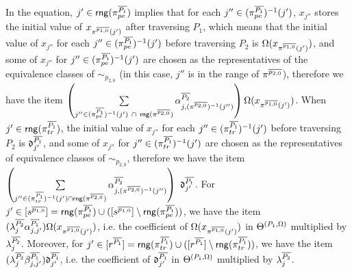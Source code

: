 In the equation, $j' \in  \mathsf{rng}(\pi^{\overline{P_1}}_{pe})$ implies that for each $j'' \in  (\pi^{\overline{P_1}}_{pe})^{-1}(j')$,  $x_{j''}$ stores the initial value of $x_{\pi^{\overline{p_{1,0}}}(j')}$ after traversing $P_1$, which means that the initial value of $x_{j''}$ for each $j'' \in  (\pi^{\overline{P_1}}_{pe})^{-1}(j')$ before traversing $P_2$ is $\Omega(x_{\pi^{\overline{p_{1,0}}}(j')})$, and some of $x_{j''}$ for $j'' \in  (\pi^{\overline{P_1}}_{pe})^{-1}(j')$ are chosen as the representatives of the equivalence classes of $\sim_{p_{2,0}}$ (in this case, $j''$ is in the range of $\pi^{\overline{p_{2,0}}}$), therefore we have the item $\left( \sum \limits_{j'' \in (\pi^{\circled{P_1}}_{pe})^{-1}(j')\ \cap\ \rng(\pi^{\circled{p_{2,0}}})}  \csta^{\circled{P_2}}_{j,(\pi^{\circled{p_{2,0}}})^{-1}(j'')} \right) \initval(x_{\pi^{\circled{p_{1,0}}}(j')})$. When $j' \in \mathsf{rng}(\pi^{\overline{P_1}}_{tr})$, the initial value of $x_{j''}$ for each $j'' \in (\pi^{\overline{P_1}}_{tr})^{-1}(j')$ before traversing $P_2$ is $\mathfrak{d}^{\overline{P_1}}_{j'}$, and some of $x_{j''}$ for $j'' \in (\pi^{\overline{P_1}}_{tr})^{-1}(j')$ are chosen as the representatives of equivalence classes of $\sim_{p_{2,0}}$, therefore we have the item $\left(\sum \limits_{j'' \in (\pi^{\circled{P_1}}_{tr})^{-1}(j') \cap \rng(\pi^{\circled{p_{2,0}}})} \csta^{\circled{P_2}}_{j, (\pi^{\circled{p_{2,0}}})^{-1}(j'')} \right)\ \vard^{\circled{P_1}}_{j'}$.
For $j'\in [s^{\overline{p_{1,0}}}] =\mathsf{rng}(\pi^{\overline{P_1}}_{pe}) \cup ([s^{\overline{p_{1,0}}}] \setminus \mathsf{rng}(\pi^{\overline{P_1}}_{pe}))$, we have the item $(\lambda^{\overline{P_2}}_{j} \alpha^{\overline{P_1}}_{j,j'}) \Omega(x_{\pi^{\overline{p_{1,0}}}(j')})$, i.e. the coefficient of $\Omega(x_{\pi^{\overline{p_{1,0}}}(j')})$ in $\Theta^{(P_1, \Omega)}$ multiplied by $\lambda^{\overline{P_2}}_{j}$. Moreover, for $j'\in [r^{\overline{P_1}}] = \mathsf{rng}(\pi^{\overline{P_1}}_{tr}) \cup ([r^{\overline{P_1}}] \setminus \mathsf{rng}(\pi^{\overline{P_1}}_{tr}))$, we have 
the item $( \lambda^{\overline{P_2}}_{j} \beta^{\overline{P_1}}_{j,j'}) \mathfrak{d}^{\overline{P_1}}_{j'}$, i.e. the coefficient of $\mathfrak{d}^{\overline{P_1}}_{j'}$ in $\Theta^{(P_1, \Omega)}$ multiplied by $\lambda^{\overline{P_2}}_{j}$.

